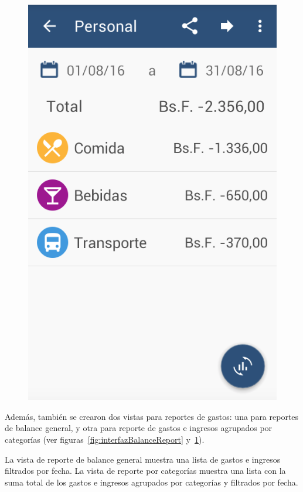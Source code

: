 \begin{figure}[ht]
\begin{minipage}{.5\textwidth}
  \includegraphics[scale=0.4,type=png,ext=.png,read=.png]{imagenes/categories_report}
  \captionsetup{justification=centering}
  \label{fig:interfazCategoriesReport}
\end{minipage}
\end{figure}

Además, también se crearon dos vistas para reportes de gastos: una para reportes de balance general, y otra para reporte de gastos e ingresos agrupados por categorías (ver figuras~\ref{fig:interfazBalanceReport} y~\ref{fig:interfazCategoriesReport}).

La vista de reporte de balance general muestra una lista de gastos e ingresos filtrados por fecha. La vista de reporte por categorías muestra una lista con la suma total de los gastos e ingresos agrupados por categorías y filtrados por fecha.


